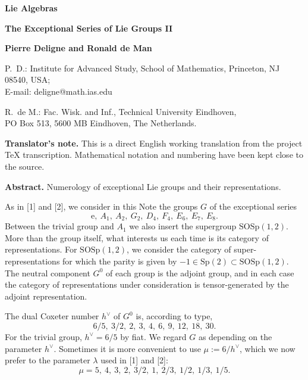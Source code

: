 \documentclass[11pt,a4paper]{article}
\theoremstyle{plain}
\theoremstyle{definition}
\begin{document}
\noindent\textbf{Lie Algebras}

\begin{center}
\Large\textbf{The Exceptional Series of Lie Groups II}
\end{center}

\begin{center}
\textbf{Pierre Deligne and Ronald de Man}
\end{center}

\noindent P.~D.: Institute for Advanced Study, School of Mathematics, Princeton, NJ 08540, USA;\\
E-mail: deligne@math.ias.edu

\medskip
\noindent R.~de M.: Fac. Wisk. and Inf., Technical University Eindhoven,\\
PO Box 513, 5600 MB Eindhoven, The Netherlands.

\medskip
\noindent\textbf{Translator's note.} This is a direct English working translation from the project TeX transcription. Mathematical notation and numbering have been kept close to the source.

\medskip
\noindent\textbf{Abstract.} Numerology of exceptional Lie groups and their representations.

\bigskip

As in [1] and [2], we consider in this Note the groups $G$ of the exceptional series
\[
\mathrm{e},\ A_1,\ A_2,\ G_2,\ D_4,\ F_4,\ E_6,\ E_7,\ E_8.
\]
Between the trivial group and $A_1$ we also insert the supergroup $\mathrm{SOSp}(1,2)$. More than the group itself, what interests us each time is its category of representations. For $\mathrm{SOSp}(1,2)$, we consider the category of super-representations for which the parity is given by $-1\in\mathrm{Sp}(2)\subset\mathrm{SOSp}(1,2)$. The neutral component $G^0$ of each group is the adjoint group, and in each case the category of representations under consideration is tensor-generated by the adjoint representation.

The dual Coxeter number $h^\vee$ of $G^0$ is, according to type,
\[
6/5,\ 3/2,\ 2,\ 3,\ 4,\ 6,\ 9,\ 12,\ 18,\ 30.
\]
For the trivial group, $h^\vee=6/5$ by fiat. We regard $G$ as depending on the parameter $h^\vee$. Sometimes it is more convenient to use $\mu:=6/h^\vee$, which we now prefer to the parameter $\lambda$ used in [1] and [2]:
\[
\mu=5,\ 4,\ 3,\ 2,\ 3/2,\ 1,\ 2/3,\ 1/2,\ 1/3,\ 1/5.
\]
\end{document}
